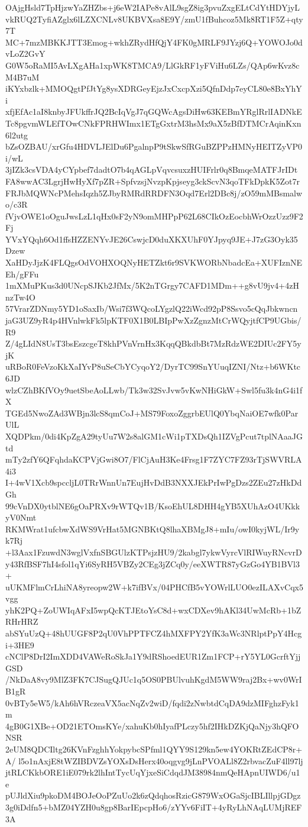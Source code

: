 OAjgHsld7TpHjzwYaZHZbs+j6eW2IAPe8vAlL9sgZ8ig3pvuZxgELtCdYtHDYjyL
vkRUQ2TyfiAZglx6lLZXCNLv8UKBVXsa8E9Y/zmU1fBuhcoz5Mk8RT1F5Z+qty7T
MC+7mzMBKKJTT3Emog+wkhZRydHfQjY4FK0gMRLF9JYzj6Q+YOWOJo0dvLoZ2GvY
G0W5oRaMI5AvLXgAHa1xpWK8TMCA9/LlGkRF1yFViHu6LZs/QAp6wKvz8cM4B7uM
iKYxbzlk+MMOQgtPfJtYg8ysXDRGeyEjzJxCxcpXzi5QfnDdp7eyCL80e8BxYhYi
xfjEfAc1aI8knbyJFUkffrJQ2BcIqVgJ7qGQWcAgsDiHw63KEBmYRglRrlIADNkE
Tc8pgvmWLEfTOwCNkFPRHWImx1ETgGxtrM3hsMx9aX5zBfDTMCrAqinKxn6l2utg
bZsOZBAU/xrGfu4HDVLJElDu6PgalnpP9tSkwSfRGuBZPPzHMNyHEITZyVP0i/wL
3jIZk3csVDA4yCYpbef7dadtO7b4qAGLpVqvcsuxzHUIFrlr0q8BmqeMATFJrIDt
FA8wwAC3LgrjHwHyXf7pZR+SpfvzsjNvzpKpjseyg3ckScvN3qoTFkDpkK5Zot7r
FRJbMQWNcPMehsIqzh5ZJbyRMRdRRDFN3Oqd7Erl2DBc8j/zO59mMBsmalwo/c3R
fVjvOWE1oOguJwsLzL1qHx0sF2yN9omMHPpP62L68CIkOzEocbhWrOzzUzz9F2Fj
YVxYQqh6Od1ffsHZZENYvJE26CswjcD0duXKXUhF0YJpyq9JE+J7zG3Oyk35Dzew
XaHDyJjzK4FLQgsOdVOHXOQNyHETZkt6r9SVKWORbNbadcEa+XUFIznNEEh/gFFu
1mXMuPKus3d0UNcpSJKb2JfMx/5K2nTGrgy7CAFD1MDm++g8vU9jv4+4zHnzTw4O
57VrarZDNmy5YD1oSaxIb/Wsi7f3WQcoLYgzlQ22iWcd92pP8Ssvo5cQqJbkwncn
jaG3UZ9yR4p4HVnlwkFk5lpKTF0X1B0LBIpPwXzZgnzMtCrWQyjtfCP9UGbis/R9
Z/4gLIdN8UsT3bsEszcgeT8khPVnVrnHx3KqqQBkdbBt7MzRdzWE2DIUc2FY5yjK
uRBoR0FeVzoKkXaIYvP8uSeCbYCyqoY2/DyrTC99SnYUuqIZNI/Ntz+b6WKtc6JD
wlzCZhBKfVOy9uetSbeAoLLwb/Tk3w32SvJvw5vKwNHiGkW+Swl5fu3k4nG4i1fX
TGEd5NwoZAd3WBjn3lcS8qmCoJ+MS79FoxoZggrbEUlQ0YbqNaiOE7wfk0ParUlL
XQDPkm/0di4KpZgA29tyUu7W2s8alGM1cWi1pTXDsQh1IZVgPcut7tplNAaaJGtd
mTy2zfY6QFqhdaKCPVjGwi8O7/FlCjAuH3Ke4Frsg1F7ZYC7FZ93rTjSWVRLA4i3
I+4wV1Xcb9spccljL0TRrWnnUn7EujHvDdB3NXXJEkPrIwPgDzs2ZEu27zHkDdGh
99cVnDX0ytblNE6gOaPRXv9rWTQv1B/KsoEhUL8DHH4gYB5XUhAzO4UKkkyV0Nmt
RKMWrat1ufcbwXdWS9VrHat5MGNBKtQ8lhaXBMgJ8+mIu/owI0kyjWL/Ir9yk7Rj
+l3Aax1FzuwdN3wglVxfnSBGUlzKTPsjzHU9/2kabgl7ykwVyrcVlRIWuyRNcvrD
y43RfBSF7hI4sfol1qYi6SyRH5VBZy2CEg3jZCq0y/eeXWTR87yGzGo4YB1BVl3+
uUKMFlmCrLhiNA8yreopw2W+k7ifBVx/04PHCfB5vYOWrlLUO0ezILAXvCqx5vgg
yhK2PQ+ZoUWIqAFxI5wpQcKTJEtoYsC8d+wxCDXev9hAKl34UwMcRb+1bZRHrHRZ
abSYuUzQ+48hUUGF8P2qU0VhPPTFCZ4hMXFPY2YfK3aWc3NRlptPpY4Hcgi+3HE9
cNClP8DrI2ImXDD4VAWeRoSkJa1Y9dRShoedEUR1Zm1FCP+rY5YL0GcrftYjjGSD
/NkDaA8vy9MlZ3FK7CJSugQJUc1q5OS0PBUlvuhKgdM5WW9raj2Bx+wv0WrIB1gR
0vBTy5eW5/kAh6hVRczeaVX5acNqZv2wiD/fqdi2zNwbtdCqDA9dzMIFghzFyk1m
4gB0G1XBe+OD21ETOmsKYe/xahuKb0hIyafPLczy5hf2IHkDZKjQaNjy3hQFONSR
2eUM8QDCIltg26KVnFzghhYokpybcSPfml1QYY9S129kn5ew4YOKRtZEdCP8r+A/
l5o1nAxjE8tWZIBDVZsYOXsDsHerx40oqgvg9jLnPVOALl8Z2rbvacZuF4ll97lj
jtRLCKkbORE1iE079rk2lhIntTycUqYjxeSiCdqdJM38984nmQeHApnUIWD6/u1e
pUJldXiu9pkoDM4BOJeOoPZuUo2k6zQdqhosRzicG879WxOGaSjcIBLIllpjGDgz
3g0iDdfn5+bMZ04YZH0u8gp8BarIEpcpHo6/zYYv6FiIT+4yRyLhNAqLUMjREF3A
